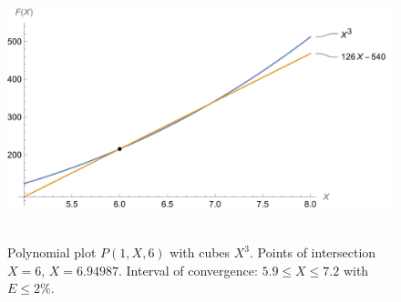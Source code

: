 ﻿\begin{figure}[H]
    \centering
    \includegraphics[width=1\textwidth]{sections/images/01_plots_polynomial_p1_n6_with_cubes}
    ~\caption{Polynomial plot $P(1, X, 6)$ with cubes $X^3$.
    Points of intersection $X=6$, $X=6.94987$.
    Interval of convergence: $5.9 \leq X \leq 7.2$ with $E \leq 2\%$.
    }\label{fig:figure7}
\end{figure}
